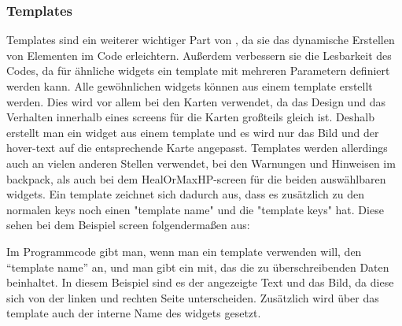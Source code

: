 \subsubsection{Templates}\label{sec:templates}
\renewcommand{\kapitelautor}{Autor: Felix Zwickelstorfer}
Templates sind ein weiterer wichtiger Part von \FF, da sie das dynamische Erstellen von Elementen im Code erleichtern.
Außerdem verbessern sie die Lesbarkeit des Codes, da für ähnliche widgets ein template mit mehreren Parametern definiert werden kann.
Alle gewöhnlichen widgets können aus einem template erstellt werden.
Dies wird vor allem bei den Karten verwendet, da das Design und das Verhalten innerhalb eines screens für die Karten großteils gleich ist.
Deshalb erstellt man ein widget aus einem template und es wird nur das Bild und der hover-text auf die entsprechende Karte angepasst.
Templates werden allerdings auch an vielen anderen Stellen verwendet, \zB bei den Warnungen und Hinweisen im backpack, als auch bei dem HealOrMaxHP-screen für die beiden auswählbaren widgets.
Ein template zeichnet sich dadurch aus, dass es zusätzlich zu den normalen keys noch einen "template name" und die "template keys" hat.
Diese sehen bei dem Beispiel screen folgendermaßen aus:
Im Programmcode gibt man, wenn man ein template verwenden will, den ``template name'' an, und man gibt ein  mit, das die zu überschreibenden Daten beinhaltet.
In diesem Beispiel sind es der angezeigte Text und das Bild, da diese sich von der linken und rechten Seite unterscheiden.
Zusätzlich wird über das template auch der interne Name des widgets gesetzt.
